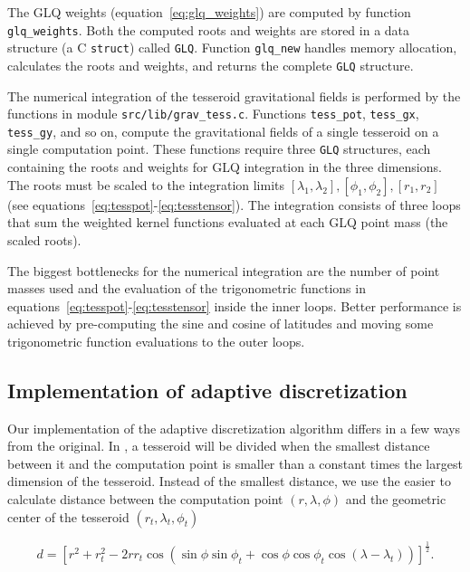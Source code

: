 \documentclass[paper,twocolumn]{geophysics}
\begin{document}
The GLQ weights (equation~\ref{eq:glq_weights})
are computed by function \texttt{glq\_weights}.
Both the computed roots and weights are stored in a data structure
(a C \texttt{struct}) called \texttt{GLQ}.
Function \texttt{glq\_new}
handles memory allocation,
calculates the roots and weights,
and returns the complete \texttt{GLQ} structure.

The numerical integration of the tesseroid gravitational fields
is performed by the functions in module \texttt{src/lib/grav\_tess.c}.
Functions \texttt{tess\_pot}, \texttt{tess\_gx}, \texttt{tess\_gy}, and so on,
compute the gravitational fields of a single tesseroid
on a single computation point.
These functions require three \texttt{GLQ} structures,
each containing the roots and weights
for GLQ integration in the three dimensions.
The roots must be scaled to the
integration limits
$[\lambda_1, \lambda_2], [\phi_1, \phi_2], [r_1, r_2]$
(see equations~\ref{eq:tesspot}-\ref{eq:tesstensor}).
The integration consists of three loops
that sum the weighted kernel functions
evaluated at each GLQ point mass (the scaled roots).

The biggest bottlenecks for the numerical integration are
the number of point masses used
and the evaluation of the trigonometric functions in
equations~\ref{eq:tesspot}-\ref{eq:tesstensor} inside the inner loops.
Better performance is achieved
by pre-computing the sine and cosine of latitudes
and moving some trigonometric function evaluations
to the outer loops.


\subsection{Implementation of adaptive discretization}

Our implementation of the adaptive discretization algorithm
differs in a few ways from the original.
In \citet{Li2011},
a tesseroid will be divided when
the smallest distance between it and the computation point
is smaller than a constant times
the largest dimension of the tesseroid.
Instead of the smallest distance,
we use the easier to calculate
distance between
the computation point $(r, \lambda, \phi)$
and the geometric center of the tesseroid
$(r_t, \lambda_t, \phi_t)$

\begin{equation}
    d = \left[
        r^2 + r_t^2 - 2 r r_t
        \cos(\sin\phi\sin\phi_t + \cos\phi\cos\phi_t
            \cos(\lambda - \lambda_t))
        \right]^{\frac{1}{2}}.
    \label{eq:distance}
\end{equation}
\end{document}
